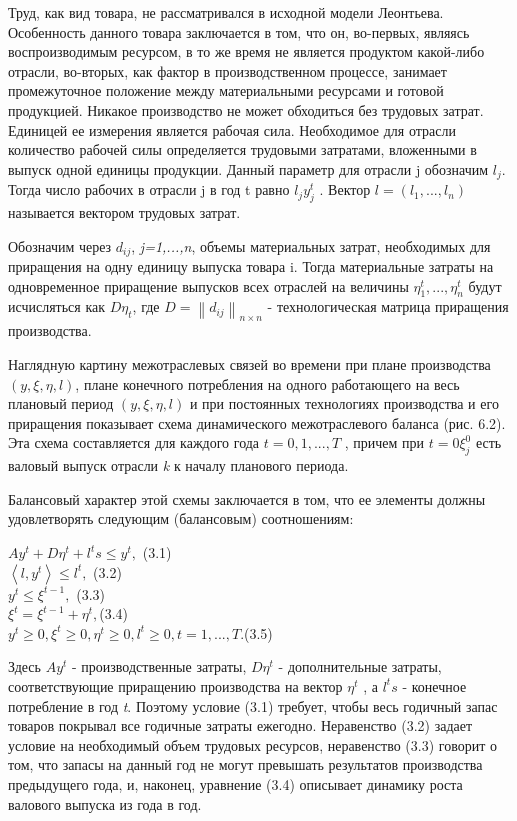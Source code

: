 \documentclass[12pt, 4paper]{book}
\begin{document}
{Труд, как вид товара, не рассматривался в исходной модели Леонтьева. Особенность данного товара заключается в том, что он, во-первых, являясь воспроизводимым ресурсом, в то же время не является продуктом какой-либо отрасли, во-вторых, как фактор в производственном процессе, занимает промежуточное положение между материальными ресурсами и готовой продукцией. Никакое производство не может обходиться без трудовых затрат. Единицей ее измерения является рабочая сила. Необходимое для отрасли количество рабочей силы определяется трудовыми затратами, вложенными в выпуск одной единицы продукции. Данный параметр для отрасли j обозначим $l_j$. Тогда число рабочих в отрасли j в год t равно $l_j y_{j}^t$ . Вектор $l=(l_1,...,l_n)$ называется вектором трудовых затрат.
\par

Обозначим через $d_{ij}$, \textit{j=1,...,n}, объемы материальных затрат, необходимых для приращения на одну единицу выпуска товара i. Тогда материальные затраты на одновременное приращение выпусков всех отраслей на величины $\eta_{1}^t,...,\eta_{n}^t$ будут исчисляться как $D\eta_t$, где $D=\left\|d_{ij}\right\|_{n \times n}$ - технологическая матрица приращения производства.
\par

Наглядную картину межотраслевых связей во времени при плане производства $(y,\xi,\eta,l)$, плане конечного потребления на одного работающего на весь плановый период $(y,\xi,\eta,l)$ и при постоянных технологиях производства и его приращения показывает схема динамического межотраслевого баланса (рис. 6.2). Эта схема составляется для каждого года $t=0,1,...,T$ , причем при $t=0 \xi_{j}^0$ есть валовый выпуск отрасли \textit{k} к началу планового периода.
\par

Балансовый характер этой схемы заключается в том, что ее элементы должны удовлетворять следующим (балансовым) соотношениям:
\begin{center}
$A y^t + D\eta^t + l^t s\leq y^t, $ (3.1)\\
$\left\langle l,y^t \right\rangle \leq l^t,$ (3.2)\\
$y^t \leq \xi^{t-1},$ (3.3)\\
$\xi^t=\xi^{t-1}+\eta^t,$(3.4)\\
$y^t \geq 0, \xi^t \geq 0 ,\eta^t \geq 0, l^t \geq 0,t=1,...,T$.(3.5)
\end{center}
\par

Здесь $Ay^t$ - производственные затраты, $D \eta^t$ - дополнительные затраты, соответствующие приращению производства на вектор $\eta^t$ , а $l^t s$ - конечное потребление в год \textit{t}. Поэтому условие (3.1) требует, чтобы весь годичный запас товаров покрывал все годичные затраты ежегодно. Неравенство (3.2) задает условие на необходимый объем трудовых ресурсов, неравенство (3.3) говорит о том, что запасы на данный год не могут превышать результатов производства предыдущего года, и, наконец, уравнение (3.4) описывает динамику роста валового выпуска из года в год.
\par

}
\end{document}
